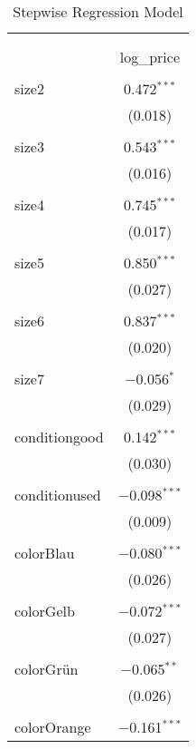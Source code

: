 
\begin{table}[!htbp] \centering 
  \caption{Stepwise Regression Model} 
  \label{tab:stepwise_model} 
\begin{tabular}{@{\extracolsep{5pt}}lc} 
\\[-1.8ex]\hline 
\hline \\[-1.8ex] 
\\[-1.8ex] & log\_price \\ 
\hline \\[-1.8ex] 
 size2 & 0.472$^{***}$ \\ 
  & (0.018) \\ 
  & \\ 
 size3 & 0.543$^{***}$ \\ 
  & (0.016) \\ 
  & \\ 
 size4 & 0.745$^{***}$ \\ 
  & (0.017) \\ 
  & \\ 
 size5 & 0.850$^{***}$ \\ 
  & (0.027) \\ 
  & \\ 
 size6 & 0.837$^{***}$ \\ 
  & (0.020) \\ 
  & \\ 
 size7 & $-$0.056$^{*}$ \\ 
  & (0.029) \\ 
  & \\ 
 conditiongood & 0.142$^{***}$ \\ 
  & (0.030) \\ 
  & \\ 
 conditionused & $-$0.098$^{***}$ \\ 
  & (0.009) \\ 
  & \\ 
 colorBlau & $-$0.080$^{***}$ \\ 
  & (0.026) \\ 
  & \\ 
 colorGelb & $-$0.072$^{***}$ \\ 
  & (0.027) \\ 
  & \\ 
 colorGrün & $-$0.065$^{**}$ \\ 
  & (0.026) \\ 
  & \\ 
 colorOrange & $-$0.161$^{***}$ \\ 

\end{tabular}
\end{table}
